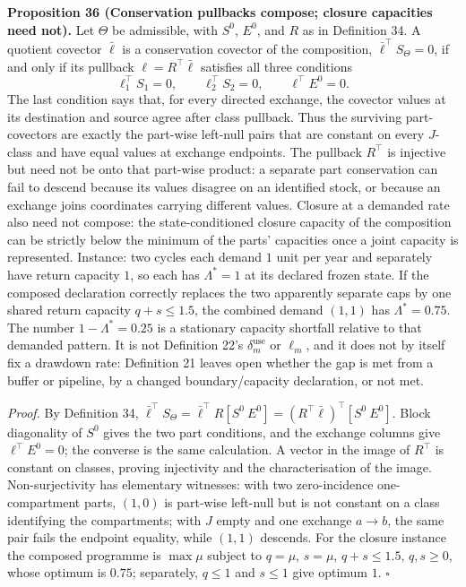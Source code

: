 \documentclass[11pt]{article}
\begin{document}
\textbf{Proposition 36 (Conservation pullbacks compose; closure capacities need not).} Let \(\Theta\) be admissible, with \(S^0\), \(E^0\), and \(R\) as in Definition 34. A quotient covector \(\bar\ell\) is a conservation covector of the composition, \(\bar\ell^\top S_\Theta=0\), if and only if its pullback \(\ell=R^\top\bar\ell\) satisfies all three conditions
$$\ell_1^\top S_1=0,\qquad \ell_2^\top S_2=0,\qquad \ell^\top E^0=0.$$
The last condition says that, for every directed exchange, the covector values at its destination and source agree after class pullback. Thus the surviving part-covectors are exactly the part-wise left-null pairs that are constant on every \(J\)-class and have equal values at exchange endpoints. The pullback \(R^\top\) is injective but need not be onto that part-wise product: a separate part conservation can fail to descend because its values disagree on an identified stock, or because an exchange joins coordinates carrying different values. Closure at a demanded rate also need not compose: the state-conditioned closure capacity of the composition can be strictly below the minimum of the parts' capacities once a joint capacity is represented. Instance: two cycles each demand \(1\) unit per year and separately have return capacity \(1\), so each has \(\Lambda^{*}=1\) at its declared frozen state. If the composed declaration correctly replaces the two apparently separate caps by one shared return capacity \(q+s\le1.5\), the combined demand \((1,1)\) has \(\Lambda^{*}=0.75\). The number \(1-\Lambda^{*}=0.25\) is a stationary capacity shortfall relative to that demanded pattern. It is not Definition 22's \(\delta_m^{\mathrm{use}}\) or \(\ell_m\), and it does not by itself fix a drawdown rate: Definition 21 leaves open whether the gap is met from a buffer or pipeline, by a changed boundary/capacity declaration, or not met.

\emph{Proof.} By Definition 34, \(\bar\ell^\top S_\Theta=\bar\ell^\top R[S^0\ E^0]=(R^\top\bar\ell)^\top[S^0\ E^0]\). Block diagonality of \(S^0\) gives the two part conditions, and the exchange columns give \(\ell^\top E^0=0\); the converse is the same calculation. A vector in the image of \(R^\top\) is constant on classes, proving injectivity and the characterisation of the image. Non-surjectivity has elementary witnesses: with two zero-incidence one-compartment parts, \((1,0)\) is part-wise left-null but is not constant on a class identifying the compartments; with \(J\) empty and one exchange \(a\to b\), the same pair fails the endpoint equality, while \((1,1)\) descends. For the closure instance the composed programme is \(\max\mu\) subject to \(q=\mu\), \(s=\mu\), \(q+s\le1.5\), \(q,s\ge0\), whose optimum is \(0.75\); separately, \(q\le1\) and \(s\le1\) give optimum \(1\). \(\square\)
\end{document}
